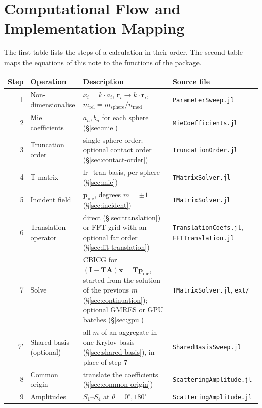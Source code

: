 \documentclass[11pt,a4paper]{article}
\begin{document}
\section{Computational Flow and Implementation Mapping}
\label{sec:flow}

The first table lists the steps of a calculation in their order.
The second table maps the equations of this note to the functions of the package.

\begin{center}
\footnotesize
\begin{tabular}{@{} r >{\raggedright\arraybackslash}p{3.0cm} >{\raggedright\arraybackslash}p{7.6cm} >{\raggedright\arraybackslash}p{4.2cm} @{}}
  \toprule
  Step & Operation & Description & Source file \\
  \midrule
  1 & Non-dimensionalise & $x_i = k \cdot a_i$, $\bm{r}_i \to k \cdot \bm{r}_i$, $m_\mathrm{rel} = m_\mathrm{sphere}/n_\mathrm{med}$ & \texttt{ParameterSweep.jl} \\
  2 & Mie coefficients & $a_n, b_n$ for each sphere (\S\ref{sec:mie}) & \texttt{MieCoefficients.jl} \\
  3 & Truncation order & single-sphere order; optional contact order (\S\ref{sec:contact-order}) & \texttt{TruncationOrder.jl} \\
  4 & T-matrix & lr\_tran basis, per sphere (\S\ref{sec:mie}) & \texttt{TMatrixSolver.jl} \\
  5 & Incident field & $\bm{p}_\mathrm{inc}$, degrees $m = \pm 1$ (\S\ref{sec:incident}) & \texttt{TMatrixSolver.jl} \\
  6 & Translation operator & direct (\S\ref{sec:translation}) or FFT grid with an optional far order (\S\ref{sec:fft-translation}) & \texttt{TranslationCoefs.jl}, \texttt{FFTTranslation.jl} \\
  7 & Solve & CBICG for $(\mathbf{I} - \mathbf{T}\mathbf{A})\bm{x} = \mathbf{T}\bm{p}_\mathrm{inc}$, started from the solution of the previous $m$ (\S\ref{sec:continuation}); optional GMRES or GPU batches (\S\ref{sec:gpu}) & \texttt{TMatrixSolver.jl}, \texttt{ext/} \\
  7' & Shared basis (optional) & all $m$ of an aggregate in one Krylov basis (\S\ref{sec:shared-basis}), in place of step 7 & \texttt{SharedBasisSweep.jl} \\
  8 & Common origin & translate the coefficients (\S\ref{sec:common-origin}) & \texttt{ScatteringAmplitude.jl} \\
  9 & Amplitudes & $S_1$--$S_4$ at $\theta = 0^\circ, 180^\circ$ & \texttt{ScatteringAmplitude.jl} \\

\end{tabular}
\end{center}
\end{document}
